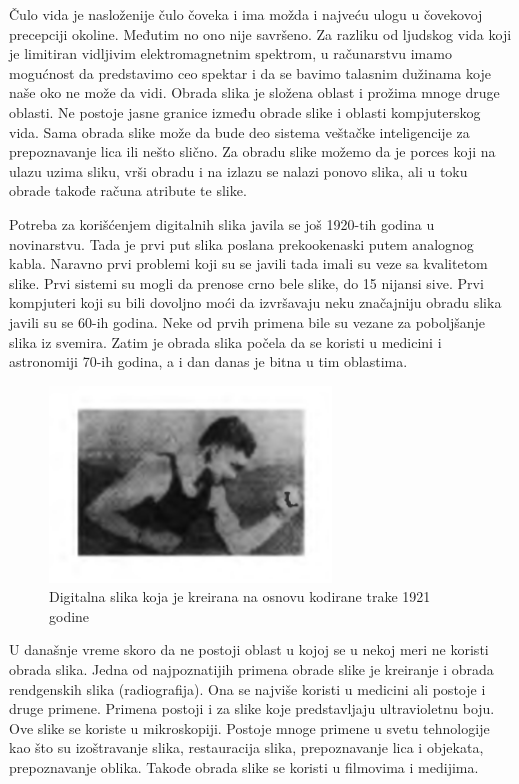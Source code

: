 \documentclass[a4paper,12pt,titlepage]{article}
\begin{document}
Čulo vida je nasloženije čulo čoveka i ima možda i najveću ulogu u čovekovoj precepciji okoline. Međutim no ono nije savršeno. Za razliku od ljudskog vida koji je limitiran vidljivim elektromagnetnim spektrom, u računarstvu imamo mogućnost da predstavimo ceo spektar i da se bavimo talasnim dužinama koje naše oko ne može da vidi. Obrada slika je složena oblast i prožima mnoge druge oblasti. Ne postoje jasne granice između obrade slike i oblasti kompjuterskog vida. Sama obrada slike može da bude deo sistema veštačke inteligencije za prepoznavanje lica ili nešto slično. Za obradu slike možemo da je porces koji na ulazu uzima sliku,   
vrši obradu i na izlazu se nalazi ponovo slika, ali u toku obrade takođe računa atribute te slike. 

Potreba za korišćenjem digitalnih slika javila se još 1920-tih godina u novinarstvu. Tada je prvi put slika poslana prekookenaski putem analognog kabla. Naravno prvi problemi koji su se javili tada imali su veze sa kvalitetom slike. Prvi sistemi su mogli da prenose crno bele slike, do 15 nijansi sive. Prvi kompjuteri koji su bili dovoljno moći da izvršavaju neku značajniju obradu slika javili su se 60-ih godina. Neke od prvih primena bile su vezane za poboljšanje slika iz svemira. Zatim je obrada slika počela da se koristi u medicini i astronomiji 70-ih godina, a i dan danas je bitna u tim oblastima.

\begin{figure}[ht!]
\centering
\includegraphics[width=75mm]{img/prvaPrenesenaSlika.png}
\caption{Digitalna slika koja je kreirana na osnovu kodirane trake 1921 godine}
\label{overflow}
\end{figure} 

U današnje vreme skoro da ne postoji oblast u kojoj se u nekoj meri ne koristi obrada slika. Jedna od najpoznatijih primena obrade slike je kreiranje i obrada rendgenskih slika (radiografija). Ona se najviše koristi u medicini ali postoje i druge primene. Primena postoji i za slike koje predstavljaju ultravioletnu boju. Ove slike se koriste u mikroskopiji. Postoje mnoge primene u svetu tehnologije kao što su izoštravanje slika, restauracija slika, prepoznavanje lica i objekata, prepoznavanje oblika. Takođe obrada slike se koristi u filmovima i medijima.  
\end{document}
